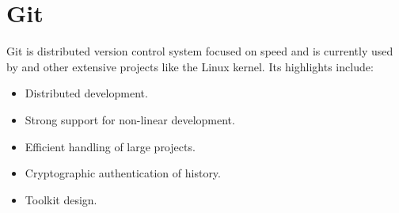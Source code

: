 
\section[Git]{Git\cite{website:git}}\label{sec:Git}

Git is distributed version control system focused on speed and is currently used by \GNOME and other extensive projects like the Linux kernel. Its highlights include:

\begin{itemize}
  \item Distributed development.
  \item Strong support for non-linear development.
  \item Efficient handling of large projects.
  \item Cryptographic authentication of history.
  \item Toolkit design.
\end{itemize}
